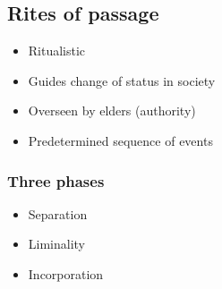 \documentclass[a4paper]{article}
\begin{document}
\subsection{Rites of passage}
\begin{itemize}
  \item Ritualistic
  \item Guides change of status in society
  \item Overseen by elders (authority)
  \item Predetermined sequence of events
\end{itemize}
\subsubsection{Three phases}
\begin{itemize}
  \item Separation
  \item Liminality
  \item Incorporation
\end{itemize}
\end{document}
